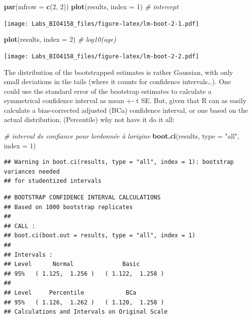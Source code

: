 \documentclass[
  12pt,
]{book}
\newenvironment{Shaded}{\begin{snugshade}}{\end{snugshade}}
\newcommand{\CommentTok}[1]{\textcolor[rgb]{0.56,0.35,0.01}{\textit{#1}}}
\newcommand{\DataTypeTok}[1]{\textcolor[rgb]{0.13,0.29,0.53}{#1}}
\newcommand{\DecValTok}[1]{\textcolor[rgb]{0.00,0.00,0.81}{#1}}
\newcommand{\KeywordTok}[1]{\textcolor[rgb]{0.13,0.29,0.53}{\textbf{#1}}}
\newcommand{\NormalTok}[1]{#1}
\newcommand{\StringTok}[1]{\textcolor[rgb]{0.31,0.60,0.02}{#1}}
\begin{document}
\begin{Shaded}
\begin{Highlighting}[]
\KeywordTok{par}\NormalTok{(}\DataTypeTok{mfrow =} \KeywordTok{c}\NormalTok{(}\DecValTok{2}\NormalTok{, }\DecValTok{2}\NormalTok{))}
\KeywordTok{plot}\NormalTok{(results, }\DataTypeTok{index =} \DecValTok{1}\NormalTok{) }\CommentTok{\# intercept}
\end{Highlighting}
\end{Shaded}

\texttt{[image: Labs\_BIO4158\_files/figure-latex/lm-boot-2-1.pdf]}

\begin{Shaded}
\begin{Highlighting}[]
\KeywordTok{plot}\NormalTok{(results, }\DataTypeTok{index =} \DecValTok{2}\NormalTok{) }\CommentTok{\# log10(age)}
\end{Highlighting}
\end{Shaded}

\texttt{[image: Labs\_BIO4158\_files/figure-latex/lm-boot-2-2.pdf]}

The distribution of the bootstrapped estimates is rather Gaussian, with only small deviations in the tails (where it counts for confidence intervals\ldots). One could use the standard error of the bootstrap estimates to calculate a symmetrical confidence interval as mean +- t SE. But, given that R can as easily calculate a bias-corrected adjusted (BCa) confidence interval, or one based on the actual distribution, (Percentile) why not have it do it all:

\begin{Shaded}
\begin{Highlighting}[]
\CommentTok{\# interval de confiance pour l\textquotesingle{}ordonnée à l\textquotesingle{}origine}
\KeywordTok{boot.ci}\NormalTok{(results, }\DataTypeTok{type =} \StringTok{"all"}\NormalTok{, }\DataTypeTok{index =} \DecValTok{1}\NormalTok{)}
\end{Highlighting}
\end{Shaded}

\begin{verbatim}
## Warning in boot.ci(results, type = "all", index = 1): bootstrap variances needed
## for studentized intervals
\end{verbatim}

\begin{verbatim}
## BOOTSTRAP CONFIDENCE INTERVAL CALCULATIONS
## Based on 1000 bootstrap replicates
## 
## CALL : 
## boot.ci(boot.out = results, type = "all", index = 1)
## 
## Intervals : 
## Level      Normal              Basic         
## 95%   ( 1.125,  1.256 )   ( 1.122,  1.258 )  
## 
## Level     Percentile            BCa          
## 95%   ( 1.126,  1.262 )   ( 1.120,  1.258 )  
## Calculations and Intervals on Original Scale
\end{verbatim}
\end{document}
